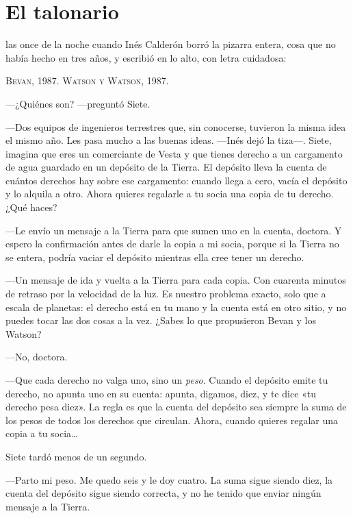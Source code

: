 \chapter{El talonario}

 las once de la noche cuando Inés Calderón borró la pizarra entera, cosa que no había hecho en tres años, y escribió en lo alto, con letra cuidadosa:

\begin{center}
\textsc{Bevan, 1987. Watson y Watson, 1987.}
\end{center}

---¿Quiénes son? ---preguntó Siete.

---Dos equipos de ingenieros terrestres que, sin conocerse, tuvieron la misma idea el mismo año. Les pasa mucho a las buenas ideas. ---Inés dejó la tiza---\nobreak. Siete, imagina que eres un comerciante de Vesta y que tienes derecho a un cargamento de agua guardado en un depósito de la Tierra. El depósito lleva la cuenta de cuántos derechos hay sobre ese cargamento: cuando llega a cero, vacía el depósito y lo alquila a otro. Ahora quieres regalarle a tu socia una copia de tu derecho. ¿Qué haces?

---Le envío un mensaje a la Tierra para que sumen uno en la cuenta, doctora. Y espero la confirmación antes de darle la copia a mi socia, porque si la Tierra no se entera, podría vaciar el depósito mientras ella cree tener un derecho.

---Un mensaje de ida y vuelta a la Tierra para cada copia. Con cuarenta minutos de retraso por la velocidad de la luz. Es nuestro problema exacto, solo que a escala de planetas: el derecho está en tu mano y la cuenta está en otro sitio, y no puedes tocar las dos cosas a la vez. ¿Sabes lo que propusieron Bevan y los Watson?

---No, doctora.

---Que cada derecho no valga uno, sino un \emph{peso}. Cuando el depósito emite tu derecho, no apunta uno en su cuenta: apunta, digamos, diez, y te dice «tu derecho pesa diez». La regla es que la cuenta del depósito sea siempre la suma de los pesos de todos los derechos que circulan. Ahora, cuando quieres regalar una copia a tu socia\ldots

Siete tardó menos de un segundo.

---Parto mi peso. Me quedo seis y le doy cuatro. La suma sigue siendo diez, la cuenta del depósito sigue siendo correcta, y no he tenido que enviar ningún mensaje a la Tierra.

